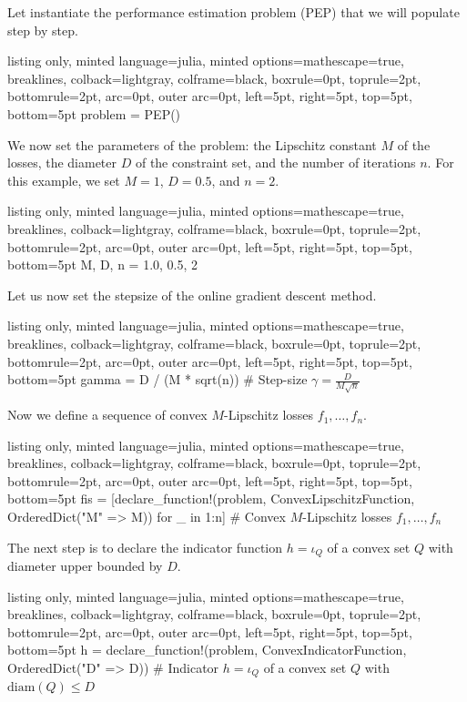 \documentclass{article}
\begin{document}
Let instantiate the performance estimation problem (PEP) that we will populate step by step.

\begin{tcblisting}{listing only, minted language=julia, minted options={mathescape=true, breaklines}, colback=lightgray, colframe=black, boxrule=0pt, toprule=2pt, bottomrule=2pt, arc=0pt, outer arc=0pt, left=5pt, right=5pt, top=5pt, bottom=5pt}
problem = PEP()
\end{tcblisting}


We now set the parameters of the problem: the Lipschitz constant $M$ of the losses, the diameter $D$ of the constraint set, and the number of iterations $n$. For this example, we set $M=1$, $D=0.5$, and $n=2$.

\begin{tcblisting}{listing only, minted language=julia, minted options={mathescape=true, breaklines}, colback=lightgray, colframe=black, boxrule=0pt, toprule=2pt, bottomrule=2pt, arc=0pt, outer arc=0pt, left=5pt, right=5pt, top=5pt, bottom=5pt}
M, D, n = 1.0, 0.5, 2
\end{tcblisting}


Let us now set the stepsize of the online gradient descent method.

\begin{tcblisting}{listing only, minted language=julia, minted options={mathescape=true, breaklines}, colback=lightgray, colframe=black, boxrule=0pt, toprule=2pt, bottomrule=2pt, arc=0pt, outer arc=0pt, left=5pt, right=5pt, top=5pt, bottom=5pt}
gamma = D / (M * sqrt(n)) # Step-size $\gamma=\frac{D}{M\sqrt{n}}$
\end{tcblisting}


Now we define a sequence of convex $M$-Lipschitz losses $f_1,\dots,f_n$.

\begin{tcblisting}{listing only, minted language=julia, minted options={mathescape=true, breaklines}, colback=lightgray, colframe=black, boxrule=0pt, toprule=2pt, bottomrule=2pt, arc=0pt, outer arc=0pt, left=5pt, right=5pt, top=5pt, bottom=5pt}
fis = [declare_function!(problem, ConvexLipschitzFunction, OrderedDict("M" => M)) for _ in 1:n] # Convex $M$-Lipschitz losses $f_1,\dots,f_n$
\end{tcblisting}


The next step is to declare the indicator function $h=\iota_Q$ of a convex set $Q$ with diameter upper bounded by $D$.

\begin{tcblisting}{listing only, minted language=julia, minted options={mathescape=true, breaklines}, colback=lightgray, colframe=black, boxrule=0pt, toprule=2pt, bottomrule=2pt, arc=0pt, outer arc=0pt, left=5pt, right=5pt, top=5pt, bottom=5pt}
h = declare_function!(problem, ConvexIndicatorFunction, OrderedDict("D" => D)) # Indicator $h=\iota_Q$ of a convex set $Q$ with $\mathrm{diam}(Q)\le D$
\end{tcblisting}
\end{document}

